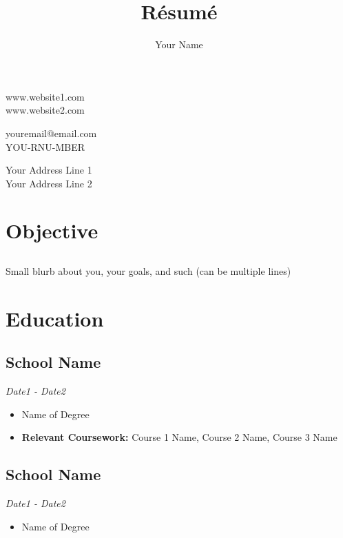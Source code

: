 \documentclass{article}
\renewcommand{\maketitle}[6]{
    \begin{center}
        {\LARGE\bfseries\theauthor}
    \end{center}

    \vspace{-20pt}

    \begin{multicols}{3}
        \begin{flushleft}
            #1 \\
            #2
        \end{flushleft}

        \begin{center}
            #3 \\
            #4
        \end{center}

        \begin{flushright}
            #5 \\
            #6
        \end{flushright}
    \end{multicols}
}
\renewcommand{\date}[1]{
    \hfill{\normalsize\textit{#1}}
}
\begin{document}
    \title{R\'esum\'e}
    \author{Your Name}

    \maketitle{
        www.website1.com
    }{
        www.website2.com
    }{
        youremail@email.com
    }{
        YOU-RNU-MBER
    }{
        Your Address Line 1
    }{
        Your Address Line 2
    }

    \section{Objective}
        \subsection{}
            Small blurb about you, your goals, and such (can be multiple lines)

    \section{Education}

        \subsection{School Name}\date{Date1 - Date2}
            \begin{itemize}
                \item Name of Degree
                \item {\bfseries Relevant Coursework: }{Course 1 Name, Course 2 Name, Course 3 Name}
            \end{itemize}
        \subsection{School Name}\date{Date1 - Date2}
            \begin{itemize}
                \item Name of Degree
            \end{itemize}
\end{document}
